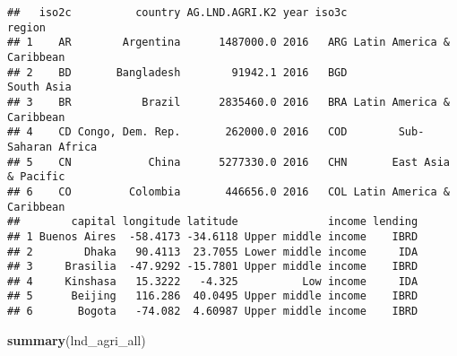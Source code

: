 \documentclass[
]{article}
\newenvironment{Shaded}{\begin{snugshade}}{\end{snugshade}}
\newcommand{\DataTypeTok}[1]{\textcolor[rgb]{0.13,0.29,0.53}{#1}}
\newcommand{\KeywordTok}[1]{\textcolor[rgb]{0.13,0.29,0.53}{\textbf{#1}}}
\newcommand{\NormalTok}[1]{#1}
\newcommand{\OperatorTok}[1]{\textcolor[rgb]{0.81,0.36,0.00}{\textbf{#1}}}
\newcommand{\OtherTok}[1]{\textcolor[rgb]{0.56,0.35,0.01}{#1}}
\newcommand{\StringTok}[1]{\textcolor[rgb]{0.31,0.60,0.02}{#1}}
\begin{document}
\begin{Shaded}
\end{Shaded}

\begin{verbatim}
##   iso2c          country AG.LND.AGRI.K2 year iso3c                    region
## 1    AR        Argentina      1487000.0 2016   ARG Latin America & Caribbean
## 2    BD       Bangladesh        91942.1 2016   BGD                South Asia
## 3    BR           Brazil      2835460.0 2016   BRA Latin America & Caribbean
## 4    CD Congo, Dem. Rep.       262000.0 2016   COD        Sub-Saharan Africa
## 5    CN            China      5277330.0 2016   CHN       East Asia & Pacific
## 6    CO         Colombia       446656.0 2016   COL Latin America & Caribbean
##        capital longitude latitude              income lending
## 1 Buenos Aires  -58.4173 -34.6118 Upper middle income    IBRD
## 2        Dhaka   90.4113  23.7055 Lower middle income     IDA
## 3     Brasilia  -47.9292 -15.7801 Upper middle income    IBRD
## 4     Kinshasa   15.3222   -4.325          Low income     IDA
## 5      Beijing   116.286  40.0495 Upper middle income    IBRD
## 6       Bogota   -74.082  4.60987 Upper middle income    IBRD
\end{verbatim}

\begin{Shaded}
\begin{Highlighting}[]
\KeywordTok{summary}\NormalTok{(lnd_agri_all)}
\end{Highlighting}
\end{Shaded}
\end{document}

